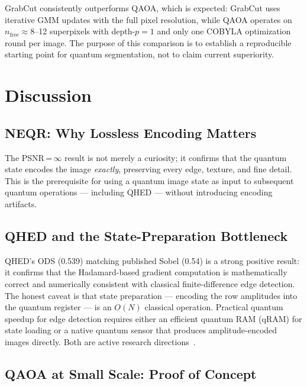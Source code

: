\documentclass[journal]{IEEEtran}
\begin{document}
GrabCut consistently outperforms QAOA, which is expected: GrabCut uses
iterative GMM updates with the full pixel resolution, while QAOA operates
on $n_{\text{free}} \approx 8$--12 superpixels with depth-$p=1$ and only
one COBYLA optimization round per image.  The purpose of this comparison is
to establish a reproducible starting point for quantum segmentation, not to
claim current superiority.

\section{Discussion}
\label{sec:discussion}

\subsection{NEQR: Why Lossless Encoding Matters}

The PSNR\,=\,$\infty$ result is not merely a curiosity; it confirms that the
quantum state encodes the image \emph{exactly}, preserving every edge,
texture, and fine detail.  This is the prerequisite for using a quantum image
state as input to subsequent quantum operations — including QHED — without
introducing encoding artifacts.

\subsection{QHED and the State-Preparation Bottleneck}

QHED's ODS (0.539) matching published Sobel (0.54) is a strong positive
result: it confirms that the Hadamard-based gradient computation is
mathematically correct and numerically consistent with classical
finite-difference edge detection.  The honest caveat is that state preparation
— encoding the row amplitudes into the quantum register — is an $O(N)$
classical operation.  Practical quantum speedup for edge detection requires
either an efficient quantum RAM (qRAM) for state loading or a native quantum
sensor that produces amplitude-encoded images directly.  Both are active
research directions~\cite{ruan2021opportunities}.

\subsection{QAOA at Small Scale: Proof of Concept}
\end{document}
